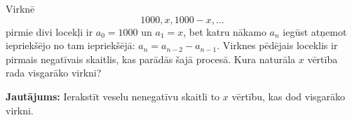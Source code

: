 \documentclass[a4paper,12pt]{article}
\newcommand\answer[1]{}
\begin{document}
\vspace{10pt}
\begin{problem}
Virknē
\[ 1000, x, 1000-x, \ldots \]
pirmie divi locekļi ir $a_0 = 1000$ un $a_1 = x$, bet katru nākamo $a_n$ iegūst atņemot iepriekšējo no tam iepriekšējā: $a_n=a_{n-2}- a_{n-1}$.
Virknes pēdējais loceklis ir pirmais negatīvais skaitlis, kas parādās šajā procesā. Kura naturāla $x$ vērtība rada visgarāko virkni?

{\bf Jautājums:} Ierakstīt veselu nenegatīvu skaitli \textendash{} to $x$ vērtību, kas dod visgarāko virkni.
\answer{

{\bf Atbilde.} $\mathtt{618}$\\

Ieviešam jaunu virkni $b_n = a_n/1000$, kur dalām visus virknes locekļus ar $1000$. 
\[ 1, x/1000, 1-x/1000, \ldots \]
Virknē $b_n$ pirmie locekļi ir $b_0 = 1$, $b_1 = t$, bet tālākie 
apmierina līdzīgu sakarību kā iepriekš: $b_n=b_{n-2}- b_{n-1}$, jo visas starpības un visi locekļi ir $1000$ reizes mazāki nekā virknē $a_n$.

}
\end{problem}
\end{document}
